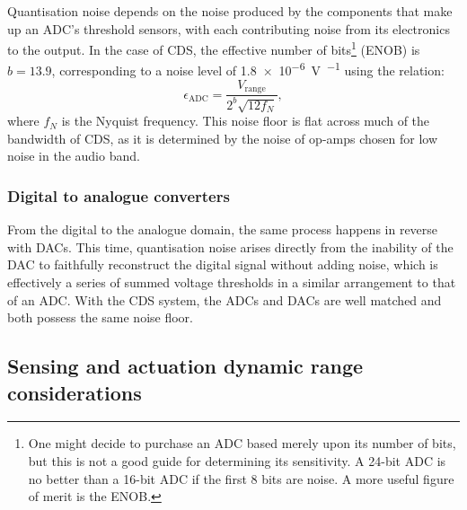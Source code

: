 Quantisation noise depends on the noise produced by the components that make up an \gls{ADC}'s threshold sensors, with each contributing noise from its electronics to the output. In the case of \gls{CDS}, the effective number of bits\footnote{One might decide to purchase an \gls{ADC} based merely upon its number of bits, but this is not a good guide for determining its sensitivity. A 24-bit \gls{ADC} is no better than a 16-bit \gls{ADC} if the first 8 bits are noise. A more useful figure of merit is the \gls{ENOB}.} (\gls{ENOB}) is $b = 13.9$, corresponding to a noise level of \SI{1.8e-6}{\volt\per\sqrthz} using the relation:
\begin{equation}
  \epsilon_{\text{ADC}} = \frac{V_{\text{range}}}{2^b \sqrt{12 f_{N}}},
\end{equation}
where $f_{N}$ is the Nyquist frequency. This noise floor is flat across much of the bandwidth of \gls{CDS}, as it is determined by the noise of op-amps chosen for low noise in the audio band.

\subsubsection{Digital to analogue converters}
From the digital to the analogue domain, the same process happens in reverse with \glspl{DAC}. This time, quantisation noise arises directly from the inability of the \gls{DAC} to faithfully reconstruct the digital signal without adding noise, which is effectively a series of summed voltage thresholds in a similar arrangement to that of an \gls{ADC}. With the \gls{CDS} system, the \glspl{ADC} and \glspl{DAC} are well matched and both possess the same noise floor.

\subsection{Sensing and actuation dynamic range considerations}

